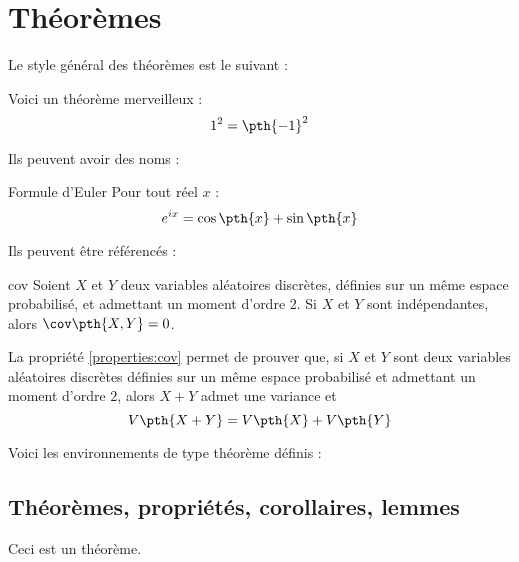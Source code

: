 
\section{Théorèmes}

    Le style général des théorèmes est le suivant :

    \begin{latexcode}
        \begin{theorem}{}{}
            Voici un théorème merveilleux : $$1^2=\pth{-1}^2$$
        \end{theorem}
    \end{latexcode}

    Ils peuvent avoir des noms :

    \begin{latexcode}
        \begin{theorem}{Formule d'Euler}{}
            Pour tout réel $x$ : $$e^{ix} = \cos\pth{x} + \sin\pth{x}$$
        \end{theorem}
    \end{latexcode}

    Ils peuvent être référencés :

    \begin{latexcode}
        \begin{property}{}{cov}
            Soient $X$ et $Y$ deux variables aléatoires discrètes, définies sur un même espace probabilisé, et admettant un moment d'ordre $2$. Si $X$ et $Y$ sont indépendantes, alors $\cov\pth{X,Y} = 0$.
        \end{property}

        La propriété \cref{properties:cov} permet de prouver que, si $X$ et $Y$ sont deux variables aléatoires discrètes définies sur un même espace probabilisé et admettant un moment d'ordre $2$, alors $X+Y$ admet une variance et $$V\pth{X+Y} = V\pth{X} + V\pth{Y}$$
    \end{latexcode}

    Voici les environnements de type théorème définis :

    \subsection{Théorèmes, propriétés, corollaires, lemmes}

    \begin{latexcode}
        \begin{theorem}{}{}
            Ceci est un théorème.
        \end{theorem}
    \end{latexcode}

